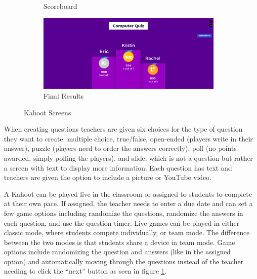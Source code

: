\documentclass{article}
\begin{document}
\begin{figure}
\begin{subfigure}[b]{0.49\textwidth}
        \caption{Scoreboard}
        \label{fig:kahoot-scoreboard}
    \end{subfigure}
    \begin{subfigure}[b]{0.49\textwidth}
        \includegraphics[width=\textwidth]{images/kahoot-finished.png}
        \caption{Final Results}
        \label{fig:kahoot-final}
    \end{subfigure}
    \caption{Kahoot Screens \cite{kahoot}}\label{fig:kahoot}
\end{figure}

When creating questions teachers are given six choices for the type of question they want to create: multiple choice, true/false, open-ended (players write in their answer), puzzle (players need to order the answers correctly), poll (no points awarded, simply polling the players), and slide, which is not a question but rather a screen with text to display more information. Each question has text and teachers are given the option to include a picture or YouTube video.
\smallskip

A Kahoot can be played live in the classroom or assigned to students to complete at their own pace. If assigned, the teacher needs to enter a due date and can set a few game options including randomize the questions, randomize the answers in each question, and use the question timer. Live games can be played in either classic mode, where students compete individually, or team mode. The difference between the two modes is that students share a device in team mode. Game options include randomizing the question and answers (like in the assigned option) and automatically moving through the questions instead of the teacher needing to click the ``next'' button as seen in figure \ref{fig:kahoot-scoreboard}.
\end{document}
